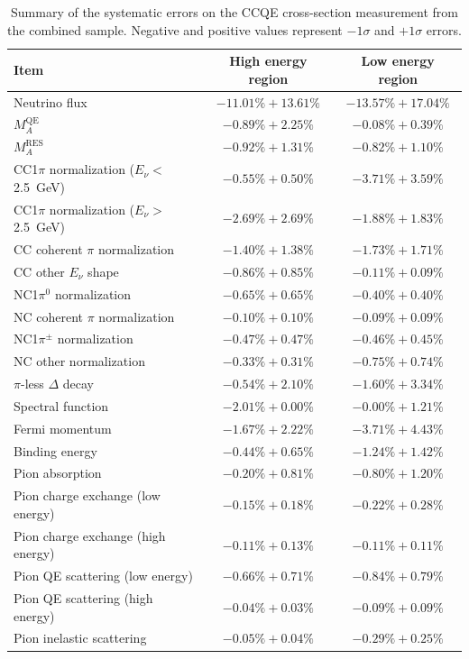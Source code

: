 \documentclass[%
 reprint,
superscriptaddress,
 amsmath,amssymb,
 aps,
]{revtex4-1}
\begin{document}
\begin{table}[htbp]
\begin{center}
\caption{Summary of the systematic errors on the CCQE cross-section measurement from the combined sample. Negative and positive values represent $-1\sigma$ and $+1\sigma$ errors.}
\begin{tabular}{lcc}
\hline \hline
Item &High energy region&Low energy region\\ \hline
Neutrino flux&$-11.01\%+13.61\%$&$-13.57\%+17.04\%$\\
\hline
$M_A^{\mathrm{QE}}$&$-0.89\%+2.25\%$&$-0.08\%+0.39\%$\\
$M_A^{\mathrm{RES}}$&$-0.92\%+1.31\%$&$-0.82\%+1.10\%$\\
CC1$\pi$ normalization  ($E_{\nu}<$2.5~GeV)&$-0.55\%+0.50\%$&$-3.71\%+3.59\%$\\
CC1$\pi$ normalization  ($E_{\nu}>$2.5~GeV)&$-2.69\%+2.69\%$&$-1.88\%+1.83\%$\\
CC coherent $\pi$ normalization&$-1.40\%+1.38\%$&$-1.73\%+1.71\%$\\
CC other $E_{\nu}$ shape&$-0.86\%+0.85\%$&$-0.11\%+0.09\%$\\
NC1$\pi^0$ normalization&$-0.65\%+0.65\%$&$-0.40\%+0.40\%$\\
NC coherent $\pi$ normalization&$-0.10\%+0.10\%$&$-0.09\%+0.09\%$\\
NC1$\pi^{\pm}$ normalization&$-0.47\%+0.47\%$&$-0.46\%+0.45\%$\\
NC other normalization&$-0.33\%+0.31\%$&$-0.75\%+0.74\%$\\
$\pi$-less $\Delta$ decay&$-0.54\%+2.10\%$&$-1.60\%+3.34\%$\\
Spectral function&$-2.01\%+0.00\%$&$-0.00\%+1.21\%$\\
Fermi momentum&$-1.67\%+2.22\%$&$-3.71\%+4.43\%$\\
Binding energy&$-0.44\%+0.65\%$&$-1.24\%+1.42\%$\\
Pion absorption&$-0.20\%+0.81\%$&$-0.80\%+1.20\%$\\
Pion charge exchange (low energy)&$-0.15\%+0.18\%$&$-0.22\%+0.28\%$\\
Pion charge exchange (high energy)&$-0.11\%+0.13\%$&$-0.11\%+0.11\%$\\
Pion QE scattering (low energy)&$-0.66\%+0.71\%$&$-0.84\%+0.79\%$\\
Pion QE scattering (high energy)&$-0.04\%+0.03\%$&$-0.09\%+0.09\%$\\
Pion inelastic scattering&$-0.05\%+0.04\%$&$-0.29\%+0.25\%$\\

\end{tabular}
\end{center}
\end{table}
\end{document}
